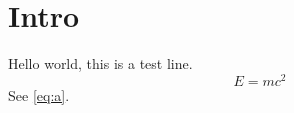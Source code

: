 \documentclass{article}
\begin{document}
\section{Intro}
Hello world, this is a test line.
\begin{equation}\label{eq:a}
E = mc^2
\end{equation}
See \ref{eq:a}.
\end{document}
